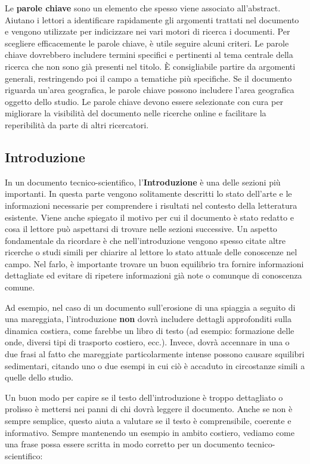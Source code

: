 \documentclass[9pt,a4paper,twoside]{rho-class/rho}
\begin{document}
Le \textbf{parole chiave} sono un elemento che spesso viene associato all’abstract. Aiutano i lettori a identificare rapidamente gli argomenti trattati nel documento e vengono utilizzate per indicizzare nei vari motori di ricerca i documenti. Per scegliere efficacemente le parole chiave, è utile seguire alcuni criteri. Le parole chiave dovrebbero includere termini specifici e pertinenti al tema centrale della ricerca che non sono già presenti nel titolo. È consigliabile partire da argomenti generali, restringendo poi il campo a tematiche più specifiche. Se il documento riguarda un’area geografica, le parole chiave possono includere l'area geografica oggetto dello studio. Le parole chiave devono essere selezionate con cura per migliorare la visibilità del documento nelle ricerche online e facilitare la reperibilità da parte di altri ricercatori. 

\subsection{Introduzione}
In un documento tecnico-scientifico, l’\textbf{Introduzione} è una delle sezioni più importanti. In questa parte vengono solitamente descritti lo stato dell’arte e le informazioni necessarie per comprendere i risultati nel contesto della letteratura esistente. Viene anche spiegato il motivo per cui il documento è stato redatto e cosa il lettore può aspettarsi di trovare nelle sezioni successive. Un aspetto fondamentale da ricordare è che nell’introduzione vengono spesso citate altre ricerche o studi simili per chiarire al lettore lo stato attuale delle conoscenze nel campo. Nel farlo, è importante trovare un buon equilibrio tra fornire informazioni dettagliate ed evitare di ripetere informazioni già note o comunque di conoscenza comune.

Ad esempio, nel caso di un documento sull’erosione di una spiaggia a seguito di una mareggiata, l’introduzione \textbf{non} dovrà includere dettagli approfonditi sulla dinamica costiera, come farebbe un libro di testo (ad esempio: formazione delle onde, diversi tipi di trasporto costiero, ecc.). Invece, dovrà accennare in una o due frasi al fatto che mareggiate particolarmente intense possono causare squilibri sedimentari, citando uno o due esempi in cui ciò è accaduto in circostanze simili a quelle dello studio.

Un buon modo per capire se il testo dell’introduzione è troppo dettagliato o prolisso è mettersi nei panni di chi dovrà leggere il documento. Anche se non è sempre semplice, questo aiuta a valutare se il testo è comprensibile, coerente e informativo. Sempre mantenendo un esempio in ambito costiero, vediamo come una frase possa essere scritta in modo corretto per un documento tecnico-scientifico:
\end{document}
